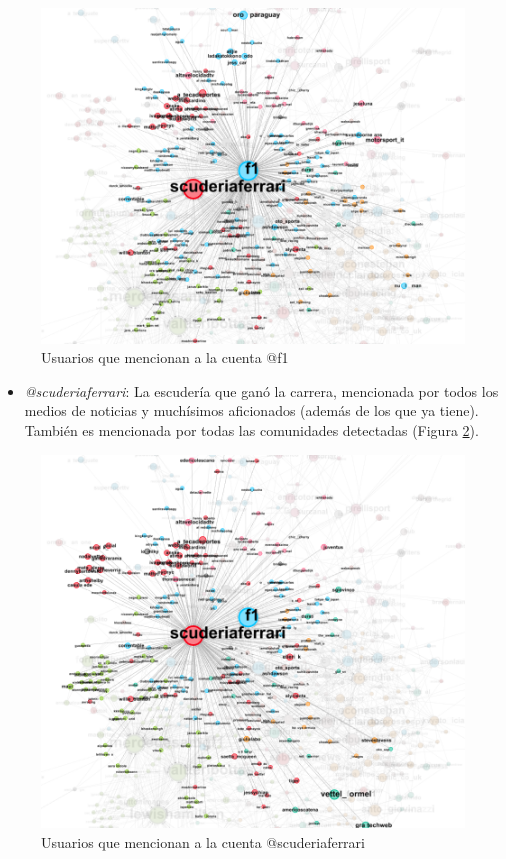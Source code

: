 \begin{figure}[H]
	\centering
	\includegraphics[width=12cm]{img/f1-mentions}
	\caption{Usuarios que mencionan a la cuenta @f1}
	\label{fig:f1-mentions}
\end{figure}

\begin{itemize}
	\item \textit{@scuderiaferrari}: La escudería que ganó la carrera, mencionada por todos los medios de noticias y muchísimos aficionados (además de los que ya tiene). También es mencionada por todas las comunidades detectadas (Figura \ref{fig:scuderiaferrari-mentions}).
\end{itemize}

\begin{figure}[H]
	\centering
	\includegraphics[width=12cm]{img/scuderiaferrari-mentions}
	\caption{Usuarios que mencionan a la cuenta @scuderiaferrari}
	\label{fig:scuderiaferrari-mentions}
\end{figure}

